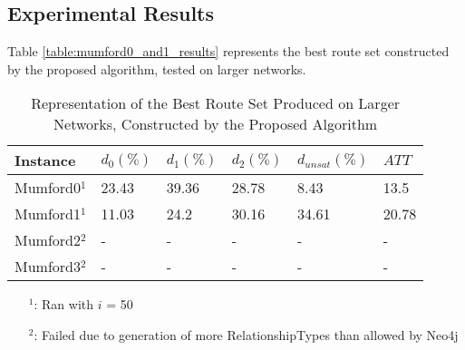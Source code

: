 \subsection{Experimental Results}
\label{subsec:scalabilityExperiments_results}


Table \vref{table:mumford0_and1_results} represents the best route set constructed by the proposed algorithm, tested on larger networks.

\begin{table}[H]
    \centering
    \hspace*{-1.0cm}
    \begin{tabular}{|l|l|l|l|l|l|}
        \hline
        Instance & $d_0(\%)$ & $d_1(\%)$ & $d_2(\%)$ & $d_{unsat}(\%)$ & $ATT$\\
        \hline
        Mumford0$^1$ & 23.43 & 39.36 & 28.78 & 8.43 & 13.5\\
        Mumford1$^1$ & 11.03 & 24.2 & 30.16 & 34.61 & 20.78\\
        Mumford2$^2$ & - & - & - & - & - \\
        Mumford3$^2$ & - & - & - & - & - \\
        \hline
    \end{tabular}
    \caption{Representation of the Best Route Set Produced on Larger Networks, Constructed by the Proposed Algorithm}
    \begin{itemize}[noitemsep]
    \item[$^1$:] Ran with $i$ = 50
    \item[$^2$:] Failed due to generation of more RelationshipTypes than allowed by Neo4j
    \end{itemize}
    \label{table:mumford0_and1_results}
\end{table}

